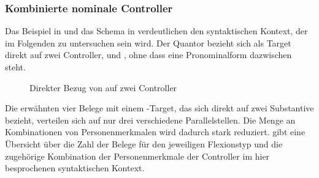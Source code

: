 \subsubsection{Kombinierte nominale Controller}
\label{subsubsec:conomctrlpers}

Das Beispiel in  und das Schema in 
verdeutlichen den syntaktischen Kontext, der im Folgenden zu untersuchen sein
wird. Der Quantor  bezieht sich als Target direkt auf zwei
Controller,  und , ohne dass eine Pronominalform
dazwischen steht.

\begin{exe}
\end{exe}

\begin{figure}
\caption{Direkter Bezug von  auf zwei Controller}
\label{fig:beid2subst}
\end{figure}

Die erwähnten vier Belege mit einem -Target, das sich direkt auf
zwei Substantive bezieht, verteilen sich auf nur drei verschiedene
Parallelstellen. Die Menge an Kombinationen von Personenmerkmalen wird dadurch
stark reduziert.  gibt eine Übersicht über die Zahl der
Belege für den jeweiligen Flexionstyp und die zugehörige Kombination der
Personenmerkmale der Controller im hier besprochenen syntaktischen Kontext.

